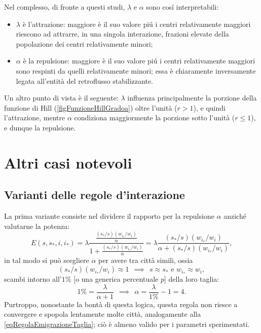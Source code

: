         Nel complesso, di fronte a questi studi, \(\lambda\) e \(\alpha\) sono cosí interpretabili:

        \begin{itemize}[
          label=\(\diamond\),
        ]
          \item \(\lambda\) è l'attrazione: maggiore è il suo valore piú i centri relativamente maggiori riescono ad attrarre, in una singola interazione, frazioni elevate della popolazione dei centri relativamente minori;
          \item \(\alpha\) è la repulsione: maggiore è il suo valore piú i centri relativamente maggiori sono respinti da quelli relativamente minori; essa è chiaramente inversamente legata all'entità del retroflusso stabilizzante.
        \end{itemize}

        Un altro punto di vista è il seguente: \(\lambda\) influenza principalmente la porzione della funzione di Hill (\cref{figFunzioneHillGradoa}) oltre l'unità (\(r>1\)), e quindi l'attrazione, mentre \(\alpha\) condiziona maggiormente la porzione sotto l'unità (\(r\le1\)), e dunque la repulsione.

  \section{Altri casi notevoli}

    \subsection{Varianti delle regole d'interazione}\label{secVariantiRegoleInterazione}

      La prima variante consiste nel dividere il rapporto per la repulsione \(\alpha\) anziché valutarne la potenza:
      \begin{equation}
        \label{eqVarianteRegolaEmigrazioneTagliaForza}
        E(s,s_*,i,i_*)
        =\lambda\frac{\frac{(s_*/s)(w_{i_*}/w_i)}\alpha}{1+\frac{(s_*/s)(w_{i_*}/w_i)}\alpha}
        =\lambda\frac{(s_*/s)(w_{i_*}/w_i)}{\alpha+(s_*/s)(w_{i_*}/w_i)},
      \end{equation}
      in tal modo si può scegliere \(\alpha\) per avere tra città simili, ossia \[(s_*/s)(w_{i_*}/w_i)\approx1\ \ \implies\ \ s\approx s_*\text{ e }w_{i_*}\approx w_i,\] scambi intorno all'\(1\%\) [o una generica percentuale \(p\)] della loro taglia:
      \begin{equation*}
        1\%=\frac\lambda{\alpha+1}\ \ \implies\ \ \alpha=\frac\lambda{1\%}-1=4.
      \end{equation*}
      Purtroppo, nonostante la bontà di questa logica, questa regola non riesce a convergere e spopola lentamente molte città, analogamente alla \ref{eqRegolaEmigrazioneTaglia}; ciò è almeno valido per i parametri sperimentati.
      
